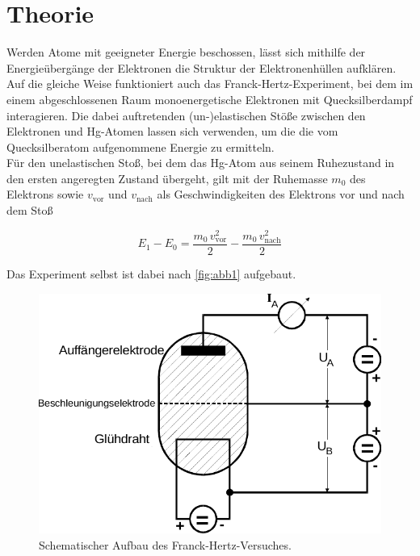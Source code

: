 \section{Theorie}
\label{sec:theorie}

Werden Atome mit geeigneter Energie beschossen, lässt sich mithilfe
der Energieübergänge der Elektronen die Struktur der Elektronenhüllen aufklären. \\

Auf die gleiche Weise funktioniert auch das Franck-Hertz-Experiment,
bei dem im einem abgeschlossenen Raum monoenergetische Elektronen mit
Quecksilberdampf interagieren.
Die dabei auftretenden (un-)elastischen Stöße zwischen den Elektronen und Hg-Atomen
lassen sich verwenden, um die die vom Quecksilberatom aufgenommene Energie zu ermitteln. \\

Für den unelastischen Stoß, bei dem das Hg-Atom aus seinem Ruhezustand in den
ersten angeregten Zustand übergeht, gilt mit der Ruhemasse $m_0$
des Elektrons sowie $v_\text{vor}$ und $v_\text{nach}$ als Geschwindigkeiten
des Elektrons vor und nach dem Stoß

\begin{equation*}
    E_1 - E_0 = \dfrac{m_0 \, v^2_\text{vor}}{2} -\dfrac{m_0 \, v^2_\text{nach}}{2}
\end{equation*}

Das Experiment selbst ist dabei nach \autoref{fig:abb1} aufgebaut.

\begin{figure}[H]
    \centering
    \includegraphics{figures/Abb_1.pdf}
    \caption{Schematischer Aufbau des Franck-Hertz-Versuches\cite{ap08}.}
    \label{fig:abb1}
\end{figure}

